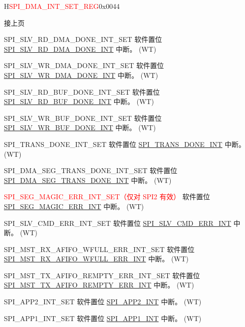 \addtocounter{Regfloat}{-1}
\begin{register}{H}{\textcolor{red}{SPI\_DMA\_INT\_SET\_REG}}{0x{}0044}
\begin{regdesc}\begin{reglist}
\item [接上页]
\label{fielddesc:SPISLVRDDMADONEINTSET}\item [SPI\_SLV\_RD\_DMA\_DONE\_INT\_SET] 软件置位 \hyperref[int:SPISLVRDDMADONEINT]{SPI\_SLV\_RD\_DMA\_DONE\_INT} 中断。 (WT)
\label{fielddesc:SPISLVWRDMADONEINTSET}\item [SPI\_SLV\_WR\_DMA\_DONE\_INT\_SET] 软件置位 \hyperref[int:SPISLVWRDMADONEINT]{SPI\_SLV\_WR\_DMA\_DONE\_INT} 中断。 (WT)
\label{fielddesc:SPISLVRDBUFDONEINTSET}\item [SPI\_SLV\_RD\_BUF\_DONE\_INT\_SET] 软件置位 \hyperref[int:SPISLVRDBUFDONEINT]{SPI\_SLV\_RD\_BUF\_DONE\_INT} 中断。 (WT)
\label{fielddesc:SPISLVWRBUFDONEINTSET}\item [SPI\_SLV\_WR\_BUF\_DONE\_INT\_SET] 软件置位 \hyperref[int:SPISLVWRBUFDONEINT]{SPI\_SLV\_WR\_BUF\_DONE\_INT} 中断。 (WT)
\label{fielddesc:SPITRANSDONEINTSET}\item [SPI\_TRANS\_DONE\_INT\_SET] 软件置位 \hyperref[int:SPITRANSDONEINT]{SPI\_TRANS\_DONE\_INT} 中断。 (WT)
\label{fielddesc:SPIDMASEGTRANSDONEINTSET}\item [SPI\_DMA\_SEG\_TRANS\_DONE\_INT\_SET] 软件置位 \hyperref[int:SPIDMASEGTRANSDONEINT]{SPI\_DMA\_SEG\_TRANS\_DONE\_INT} 中断。 (WT)
\label{fielddesc:SPISEGMAGICERRINTSET}\item [\textcolor{red}{SPI\_SEG\_MAGIC\_ERR\_INT\_SET（仅对 SPI2 有效）}] 软件置位 \hyperref[int:SPISEGMAGICERRINT]{SPI\_SEG\_MAGIC\_ERR\_INT} 中断。 (WT)
\label{fielddesc:SPISLVCMDERRINTSET}\item [SPI\_SLV\_CMD\_ERR\_INT\_SET] 软件置位 \hyperref[int:SPISLVCMDERRINT]{SPI\_SLV\_CMD\_ERR\_INT} 中断。 (WT)
\label{fielddesc:SPIMSTRXAFIFOWFULLERRINTSET}\item [SPI\_MST\_RX\_AFIFO\_WFULL\_ERR\_INT\_SET] 软件置位 \hyperref[int:SPIMSTRXAFIFOWFULLERRINT]{SPI\_MST\_RX\_AFIFO\_WFULL\_ERR\_INT} 中断。 (WT)
\label{fielddesc:SPIMSTTXAFIFOREMPTYERRINTSET}\item [SPI\_MST\_TX\_AFIFO\_REMPTY\_ERR\_INT\_SET] 软件置位 \hyperref[int:SPIMSTTXAFIFOREMPTYERRINT]{SPI\_MST\_TX\_AFIFO\_REMPTY\_ERR\_INT} 中断。 (WT)
\label{fielddesc:SPIAPP2INTSET}\item [SPI\_APP2\_INT\_SET] 软件置位 \hyperref[int:SPIAPP2INT]{SPI\_APP2\_INT} 中断。 (WT)
\label{fielddesc:SPIAPP1INTSET}\item [SPI\_APP1\_INT\_SET] 软件置位 \hyperref[int:SPIAPP1INT]{SPI\_APP1\_INT} 中断。 (WT)
\end{reglist}\end{regdesc}
\end{register}


